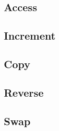 \subsection{Access}

\subsection{Increment}

\subsection{Copy}

\subsection{Reverse}

\subsection{Swap}